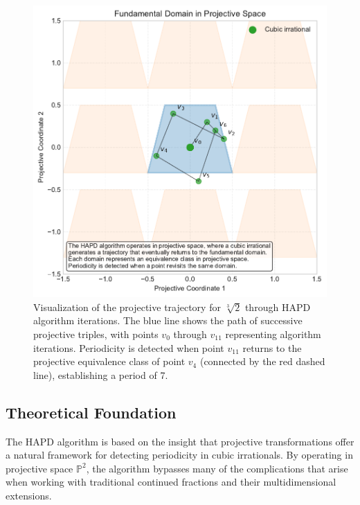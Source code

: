 \begin{figure}[htbp]
\begin{minipage}{\textwidth}
\centering
\includegraphics[width=\textwidth]{figures/projective_space_regions.pdf}
\caption{Visualization of the projective trajectory for $\sqrt[3]{2}$ through HAPD algorithm iterations. The blue line shows the path of successive projective triples, with points $v_0$ through $v_{11}$ representing algorithm iterations. Periodicity is detected when point $v_{11}$ returns to the projective equivalence class of point $v_4$ (connected by the red dashed line), establishing a period of 7.}
\label{fig:projective_trajectory}
\end{minipage}
\end{figure}

\subsection{Theoretical Foundation}

The HAPD algorithm is based on the insight that projective transformations offer a natural framework for detecting periodicity in cubic irrationals. By operating in projective space $\mathbb{P}^2$, the algorithm bypasses many of the complications that arise when working with traditional continued fractions and their multidimensional extensions.

